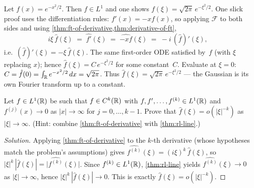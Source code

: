 \begin{example}
\label{ex:ft-gaussian}
Let $f(x) = e^{-x^2/2}$. Then $f \in L^1$ and one shows
$\hat f(\xi) = \sqrt{2\pi}\, e^{-\xi^2/2}$. One slick proof uses the
differentiation rules: $f'(x) = -x f(x)$, so applying $\mathcal{F}$ to
both sides and using
\cref{thm:ft-of-derivative,thm:derivative-of-ft},
\[
  i \xi\, \hat f(\xi) \;=\; \widehat{f'}(\xi) \;=\; \widehat{-x f}(\xi) \;=\; -i\, (\hat f)'(\xi),
\]
i.e.\ $(\hat f)'(\xi) = -\xi\, \hat f(\xi)$. The same first-order ODE
satisfied by~$f$ (with $\xi$ replacing $x$); hence
$\hat f(\xi) = C\, e^{-\xi^2/2}$ for some constant~$C$. Evaluate at
$\xi = 0$: $C = \hat f(0) = \int_{\mathbb{R}} e^{-x^2/2}\, dx = \sqrt{2\pi}$.
Thus $\hat f(\xi) = \sqrt{2\pi}\, e^{-\xi^2/2}$ — the Gaussian is its
own Fourier transform up to a constant.
\end{example}

\begin{problem}
\label{prob:smoothness-decay}
Let $f \in L^1(\mathbb{R})$ be such that $f \in C^k(\mathbb{R})$ with
$f, f', \dots, f^{(k)} \in L^1(\mathbb{R})$ and
$f^{(j)}(x) \to 0$ as $|x| \to \infty$ for $j = 0, \dots, k - 1$.
Prove that $\hat f(\xi) = o(|\xi|^{-k})$ as $|\xi| \to \infty$.
(Hint: combine \cref{thm:ft-of-derivative} with \cref{thm:rl-line}.)
\end{problem}

\begin{proof}[Solution]
Applying \cref{thm:ft-of-derivative} to the $k$-th derivative (whose
hypotheses match the problem's assumptions) gives
$\widehat{f^{(k)}}(\xi) = (i\xi)^k\, \hat f(\xi)$, so
$|\xi|^k\, |\hat f(\xi)| = \bigl|\widehat{f^{(k)}}(\xi)\bigr|$. Since
$f^{(k)} \in L^1(\mathbb{R})$, \cref{thm:rl-line} yields
$\widehat{f^{(k)}}(\xi) \to 0$ as $|\xi| \to \infty$, hence
$|\xi|^k\, |\hat f(\xi)| \to 0$. This is exactly
$\hat f(\xi) = o(|\xi|^{-k})$.
\end{proof}
